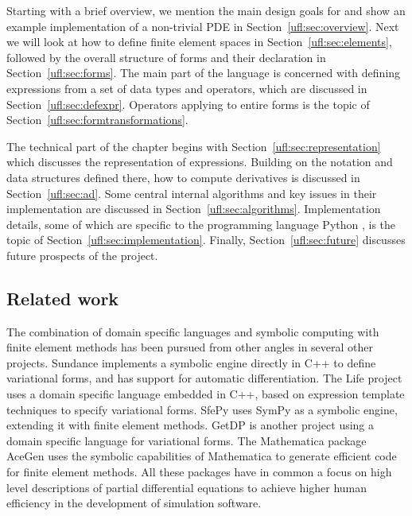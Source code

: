 Starting with a brief overview, we mention the main design goals
for \ufl{} and show an example implementation of a non-trivial
PDE in Section~\ref{ufl:sec:overview}.  Next we will look at how
to define finite element spaces in Section~\ref{ufl:sec:elements},
followed by the overall structure of forms and their declaration in
Section~\ref{ufl:sec:forms}.  The main part of the language is concerned
with defining expressions from a set of data types and operators, which
are discussed in Section~\ref{ufl:sec:defexpr}.  Operators applying to
entire forms is the topic of Section~\ref{ufl:sec:formtransformations}.

The technical part of the chapter begins with
Section~\ref{ufl:sec:representation} which discusses the
representation of expressions.  Building on the notation and
data structures defined there, how to compute derivatives is
discussed in Section~\ref{ufl:sec:ad}.  Some central internal
algorithms and key issues in their implementation are discussed in
Section~\ref{ufl:sec:algorithms}.  Implementation details, some of which
are specific to the programming language Python \citep{Rossumothers},
is the topic of Section~\ref{ufl:sec:implementation}.  Finally,
Section~\ref{ufl:sec:future} discusses future prospects of the \ufl{}
project.

\subsection{Related work} \label{ufl:sec:related}

The combination of domain specific languages and symbolic computing
with finite element methods has been pursued from other angles in
several other projects.  Sundance \citep{Long2003,Long2004a,Long2004}
implements a symbolic engine directly in C++ to define variational
forms, and has support for automatic differentiation.  The Life
\citep{Prudhomme2006a,Prudhomme2006} project uses a domain specific
language embedded in C++, based on expression template techniques
to specify variational forms.  SfePy \citep{Cimrman2008} uses SymPy
as a symbolic engine, extending it with finite element methods.
GetDP \citep{DularGeuzaine2005} is another project using a domain
specific language for variational forms.  The Mathematica package
AceGen \citep{Korelc1997,Korelc2002} uses the symbolic capabilities
of Mathematica to generate efficient code for finite element methods.
All these packages have in common a focus on high level descriptions
of partial differential equations to achieve higher human efficiency in
the development of simulation software.

